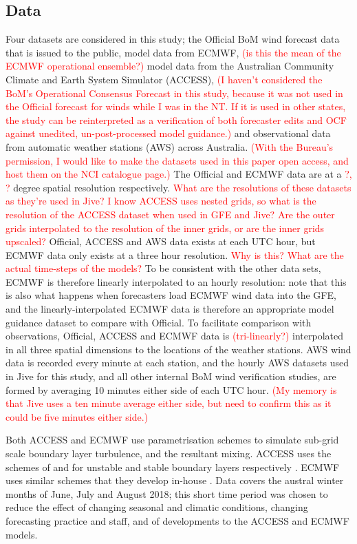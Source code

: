 \documentclass{ametsoc}
\begin{document}
\subsection{Data} 
Four datasets are considered in this study; the Official BoM wind forecast data that is issued to the public, model data from ECMWF, \textcolor{red}{(is this the mean of the ECMWF operational ensemble?)} model data from the Australian Community Climate and Earth System Simulator (ACCESS), \textcolor{red}{(I haven't considered the BoM's Operational Consensus Forecast in this study, because it was not used in the Official forecast for winds while I was in the NT. If it is used in other states, the study can be reinterpreted as a verification of both forecaster edits and OCF against unedited, un-post-processed model guidance.)} and observational data from automatic weather stations (AWS) across Australia. \textcolor{red}{(With the Bureau's permission, I would like to make the datasets used in this paper open access, and host them on the NCI catalogue page.)} The Official and ECMWF data are at a \textcolor{red}{?, ?} degree spatial resolution respectively. \textcolor{red}{What are the resolutions of these datasets as they're used in Jive? I know ACCESS uses nested grids, so what is the resolution of the ACCESS dataset when used in GFE and Jive? Are the outer grids interpolated to the resolution of the inner grids, or are the inner grids upscaled?} Official, ACCESS and AWS data exists at each UTC hour, but ECMWF data only exists at a three hour resolution. \textcolor{red}{Why is this? What are the actual time-steps of the models?} To be consistent with the other data sets, ECMWF is therefore linearly interpolated to an hourly resolution: note that this is also what happens when forecasters load ECMWF wind data into the GFE, and the linearly-interpolated ECMWF data is therefore an appropriate model guidance dataset to compare with Official. To facilitate comparison with observations, Official, ACCESS and ECMWF data is \textcolor{red}{(tri-linearly?)} interpolated in all three spatial dimensions to the locations of the weather stations. AWS wind data is recorded every minute at each station, and the hourly AWS datasets used in Jive for this study, and all other internal BoM wind verification studies, are formed by averaging 10 minutes either side of each UTC hour. \textcolor{red}{(My memory is that Jive uses a ten minute average either side, but need to confirm this as it could be five minutes either side.)}

Both ACCESS and ECMWF use parametrisation schemes to simulate sub-grid scale boundary layer turbulence, and the resultant mixing. ACCESS uses the schemes of \citet{lock00} and \citet{louis79} for unstable and stable boundary layers respectively \citep{bom10}. ECMWF uses similar schemes that they develop in-house \citep{ecmwf18}. Data covers the austral winter months of June, July and August 2018; this short time period was chosen to reduce the effect of changing seasonal and climatic conditions, changing forecasting practice and staff, and of developments to the ACCESS and ECMWF models.
\end{document}
